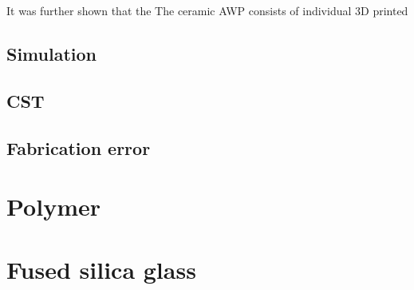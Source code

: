 It was further shown that the 
The ceramic AWP consists of individual 3D printed 


\subsection{Simulation}
\subsection{CST}
\subsection{Fabrication error}

\section{Polymer}

\section{Fused silica glass}




